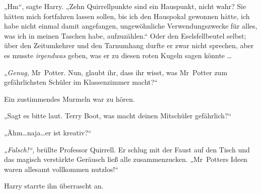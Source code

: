 „Hm“, sagte Harry. „Zehn Quirrellpunkte sind ein Hauspunkt, nicht wahr? Sie hätten mich fortfahren lassen sollen, bis ich den Hauspokal gewonnen hätte, ich habe nicht einmal damit angefangen, ungewöhnliche Verwendungszwecke für alles, was ich in meinen Taschen habe, aufzuzählen.“ Oder den Eselsfellbeutel selbst; über den Zeitumkehrer und den Tarnumhang durfte er zwar nicht sprechen, aber es musste \emph{irgendwas} geben, was er zu diesen roten Kugeln sagen könnte …

„\emph{Genug,} Mr~Potter. Nun, glaubt ihr, dass ihr wisst, was Mr~Potter zum gefährlichsten Schüler im Klassenzimmer macht?“

Ein zustimmendes Murmeln war zu hören.

„Sagt es bitte laut. Terry Boot, was macht deinen Mitschüler gefährlich?“

„Ähm…naja…er ist kreativ?“

\emph{„Falsch!“,} brüllte Professor Quirrell. Er schlug mit der Faust auf den Tisch und das magisch verstärkte Geräusch ließ alle zusammenzucken. „Mr~Potters Ideen waren allesamt vollkommen nutzlos!“

Harry starrte ihn überrascht an.

